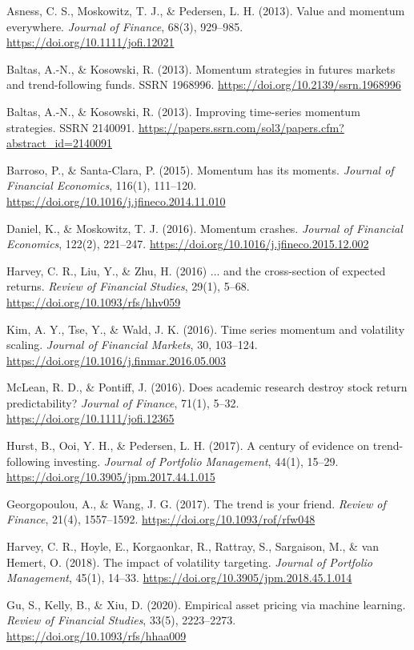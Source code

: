 \documentclass[11pt,a4paper]{article}
\begin{document}
\begin{enumerate}[label={[\arabic*]},itemsep=2pt]
\item Asness, C. S., Moskowitz, T. J., \& Pedersen, L. H. (2013). Value and momentum everywhere. \emph{Journal of Finance}, 68(3), 929--985. \url{https://doi.org/10.1111/jofi.12021}
\item Baltas, A.-N., \& Kosowski, R. (2013). Momentum strategies in futures markets and trend-following funds. SSRN 1968996. \url{https://doi.org/10.2139/ssrn.1968996}
\item Baltas, A.-N., \& Kosowski, R. (2013). Improving time-series momentum strategies. SSRN 2140091. \url{https://papers.ssrn.com/sol3/papers.cfm?abstract_id=2140091}
\item Barroso, P., \& Santa-Clara, P. (2015). Momentum has its moments. \emph{Journal of Financial Economics}, 116(1), 111--120. \url{https://doi.org/10.1016/j.jfineco.2014.11.010}
\item Daniel, K., \& Moskowitz, T. J. (2016). Momentum crashes. \emph{Journal of Financial Economics}, 122(2), 221--247. \url{https://doi.org/10.1016/j.jfineco.2015.12.002}
\item Harvey, C. R., Liu, Y., \& Zhu, H. (2016) ... and the cross-section of expected returns. \emph{Review of Financial Studies}, 29(1), 5--68. \url{https://doi.org/10.1093/rfs/hhv059}
\item Kim, A. Y., Tse, Y., \& Wald, J. K. (2016). Time series momentum and volatility scaling. \emph{Journal of Financial Markets}, 30, 103--124. \url{https://doi.org/10.1016/j.finmar.2016.05.003}
\item McLean, R. D., \& Pontiff, J. (2016). Does academic research destroy stock return predictability? \emph{Journal of Finance}, 71(1), 5--32. \url{https://doi.org/10.1111/jofi.12365}
\item Hurst, B., Ooi, Y. H., \& Pedersen, L. H. (2017). A century of evidence on trend-following investing. \emph{Journal of Portfolio Management}, 44(1), 15--29. \url{https://doi.org/10.3905/jpm.2017.44.1.015}
\item Georgopoulou, A., \& Wang, J. G. (2017). The trend is your friend. \emph{Review of Finance}, 21(4), 1557--1592. \url{https://doi.org/10.1093/rof/rfw048}
\item Harvey, C. R., Hoyle, E., Korgaonkar, R., Rattray, S., Sargaison, M., \& van Hemert, O. (2018). The impact of volatility targeting. \emph{Journal of Portfolio Management}, 45(1), 14--33. \url{https://doi.org/10.3905/jpm.2018.45.1.014}
\item Gu, S., Kelly, B., \& Xiu, D. (2020). Empirical asset pricing via machine learning. \emph{Review of Financial Studies}, 33(5), 2223--2273. \url{https://doi.org/10.1093/rfs/hhaa009}

\end{enumerate}
\end{document}
